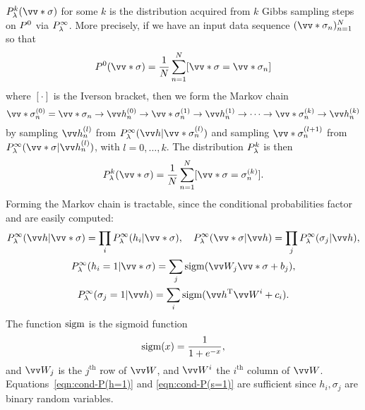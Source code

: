 $\Pk(\vv*\sigma)$ for some $k$ is the distribution acquired from $k$ Gibbs sampling steps on
$P^0$ via $P^\infty_\lambda$. More precisely, if we have an input data sequence
$(\vv*\sigma_n)_{n=1}^N$ so that
\begin{equation}
\Pdat(\vv*\sigma) = \frac1N\sum_{n=1}^N[\vv*\sigma = \vv*\sigma_n]
\end{equation}
where $[\cdot]$ is the Iverson bracket, then we form the Markov chain
\begin{equation}\label{mc:alt-gibbs}
\vv*\sigma_n^{(0)} = \vv*\sigma_n \to \vv h_n^{(0)}
\to \vv*\sigma_n^{(1)} \to \vv h_n^{(1)} \to \cdots
\to \vv*\sigma_n^{(k)} \to \vv h_n^{(k)}
\end{equation}
by sampling $\vv h^{(l)}_n$ from $\Peq(\vv h|\vv*\sigma_n^{(l)})$ and sampling
$\vv*\sigma_n^{(l+1)}$ from $\Peq(\vv*\sigma|\vv h_n^{(l)})$, with $l = 0,\dotsc,k$. The
distribution $P^k_\lambda$ is then
\begin{equation}\label{eqn:Pk}
\Pk(\vv*\sigma)
= \frac1N\sum_{n=1}^N[\vv*\sigma = \sigma_n^{(k)}].
\end{equation}
Forming the Markov chain is tractable, since the conditional probabilities factor and are
easily computed:
\begin{subequations}\label{eqn:cond-P}\begin{gather}
\label{eqn:cond-P-factors}
\Peq(\vv h|\vv*\sigma) = \prod_i \Peq(h_i|\vv*\sigma),\quad
\Peq(\vv*\sigma|\vv h) = \prod_j \Peq(\sigma_j|\vv h),
\\
\label{eqn:cond-P(h=1)}
\Peq(h_i=1|\vv*\sigma)
= \sum_j\sigm(\vv W_j\vv*\sigma + b_j),
\\
\label{eqn:cond-P(s=1)}
\Peq(\sigma_j=1|\vv h)
= \sum_i\sigm(\vv h\trans\vv W^i + c_i).
\end{gather}\end{subequations}
The function $\operatorname{sigm}$ is the sigmoid function
\begin{equation}
\operatorname{sigm}(x) = \frac1{1+e^{-x}},
\end{equation}
and $\vv W_j$ is the $j^{\mathrm{th}}$ row of $\vv W$, and $\vv W^i$ the $i^{\mathrm{th}}$
column of $\vv W$. Equations~\eqref{eqn:cond-P(h=1)} and \eqref{eqn:cond-P(s=1)} are
sufficient since $h_i, \sigma_j$ are binary random variables.

